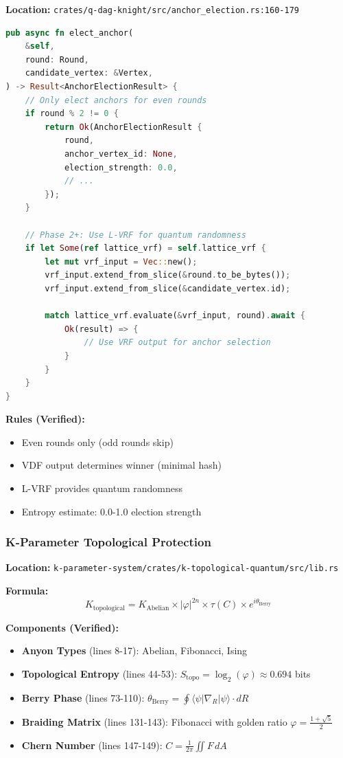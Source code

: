 \documentclass[11pt,a4paper]{article}
\begin{document}
\textbf{Location:} \texttt{crates/q-dag-knight/src/anchor\_election.rs:160-179}

\begin{lstlisting}[language=Rust,caption={VRF-Enhanced Anchor Election}]
pub async fn elect_anchor(
    &self,
    round: Round,
    candidate_vertex: &Vertex,
) -> Result<AnchorElectionResult> {
    // Only elect anchors for even rounds
    if round % 2 != 0 {
        return Ok(AnchorElectionResult {
            round,
            anchor_vertex_id: None,
            election_strength: 0.0,
            // ...
        });
    }

    // Phase 2+: Use L-VRF for quantum randomness
    if let Some(ref lattice_vrf) = self.lattice_vrf {
        let mut vrf_input = Vec::new();
        vrf_input.extend_from_slice(&round.to_be_bytes());
        vrf_input.extend_from_slice(&candidate_vertex.id);

        match lattice_vrf.evaluate(&vrf_input, round).await {
            Ok(result) => {
                // Use VRF output for anchor selection
            }
        }
    }
}
\end{lstlisting}

\textbf{Rules (Verified):}
\begin{itemize}
    \item Even rounds only (odd rounds skip)
    \item VDF output determines winner (minimal hash)
    \item L-VRF provides quantum randomness
    \item Entropy estimate: 0.0-1.0 election strength
\end{itemize}

\subsubsection{K-Parameter Topological Protection}

\textbf{Location:} \texttt{k-parameter-system/crates/k-topological-quantum/src/lib.rs}

\textbf{Formula:}
\[
K_{\text{topological}} = K_{\text{Abelian}} \times |\varphi|^{2n} \times \tau(C) \times e^{i\theta_{\text{Berry}}}
\]

\textbf{Components (Verified):}
\begin{itemize}
    \item \textbf{Anyon Types} (lines 8-17): Abelian, Fibonacci, Ising
    \item \textbf{Topological Entropy} (lines 44-53): $S_{\text{topo}} = \log_2(\varphi) \approx 0.694$ bits
    \item \textbf{Berry Phase} (lines 73-110): $\theta_{\text{Berry}} = \oint\langle\psi|\nabla_R|\psi\rangle\cdot dR$
    \item \textbf{Braiding Matrix} (lines 131-143): Fibonacci with golden ratio $\varphi = \frac{1+\sqrt{5}}{2}$
    \item \textbf{Chern Number} (lines 147-149): $C = \frac{1}{2\pi}\iint F\,dA$
\end{itemize}
\end{document}
